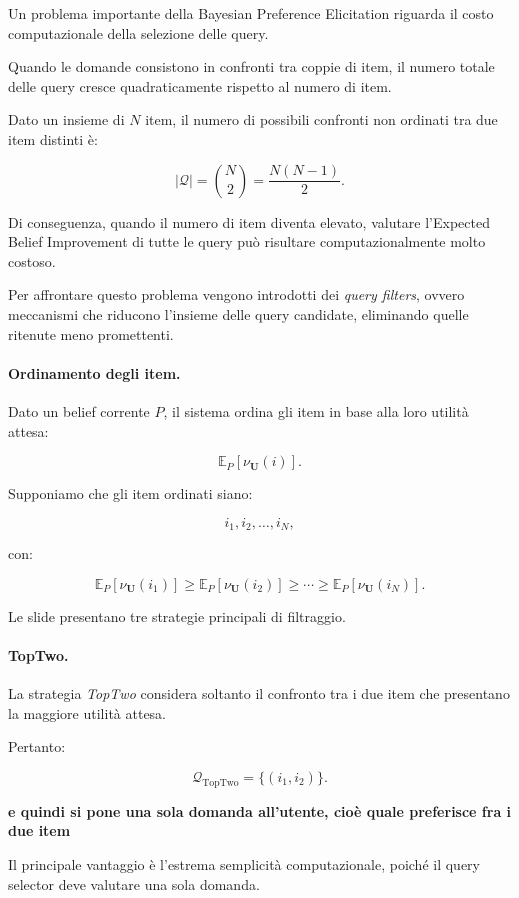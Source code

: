 Un problema importante della Bayesian Preference Elicitation riguarda il costo computazionale della selezione delle query.

Quando le domande consistono in confronti tra coppie di item, il numero totale delle query cresce quadraticamente rispetto al numero di item.

Dato un insieme di $N$ item, il numero di possibili confronti non ordinati tra due item distinti è:

\[
|\mathcal{Q}|
=
\binom{N}{2}
=
\frac{N(N-1)}{2}.
\]

Di conseguenza, quando il numero di item diventa elevato, valutare l'Expected Belief Improvement di tutte le query può risultare computazionalmente molto costoso.

Per affrontare questo problema vengono introdotti dei \textit{query filters}, ovvero meccanismi che riducono l'insieme delle query candidate, eliminando quelle ritenute meno promettenti.

\paragraph{Ordinamento degli item.}

Dato un belief corrente $P$, il sistema ordina gli item in base alla loro utilità attesa:

\[
\mathbb{E}_P[\nu_{\mathbf{U}}(i)].
\]

Supponiamo che gli item ordinati siano:

\[
i_1,i_2,\ldots,i_N,
\]

con:

\[
\mathbb{E}_P[\nu_{\mathbf{U}}(i_1)]
\geq
\mathbb{E}_P[\nu_{\mathbf{U}}(i_2)]
\geq
\cdots
\geq
\mathbb{E}_P[\nu_{\mathbf{U}}(i_N)].
\]

Le slide presentano tre strategie principali di filtraggio.

\paragraph{TopTwo.}

La strategia \textit{TopTwo} considera soltanto il confronto tra i due item che presentano la maggiore utilità attesa.

Pertanto:

\[
\mathcal{Q}_{\mathrm{TopTwo}}
=
\{(i_1,i_2)\}.
\]

\textbf{e quindi si pone una sola domanda all'utente, cioè quale preferisce fra i due item}

Il principale vantaggio è l'estrema semplicità computazionale, poiché il query selector deve valutare una sola domanda.

